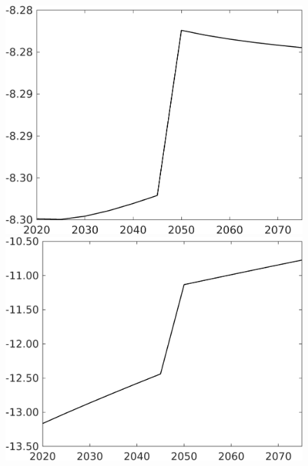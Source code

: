 \documentclass[12pt]{article}
\begin{document}
\begin{figure}[h!!]
\begin{minipage}[]{0.32\textwidth}
	\end{minipage}
	\begin{minipage}[]{0.32\textwidth}
		\includegraphics[width=1\textwidth]{../../codding_model/own_basedOnFried/optimalPol_010922_revision/figures/all_13Sept22/CompTaufPER_bytaul_Reg0_Ln_spillover0_nsk0_xgr1_knspil0_sep1_LFlimit1_emsbase0_countec0_GovRev0_etaa0.79_lgd0.png}
	\end{minipage}			
	\begin{minipage}[]{0.32\textwidth}
		\includegraphics[width=1\textwidth]{../../codding_model/own_basedOnFried/optimalPol_010922_revision/figures/all_13Sept22/CompTaufPER_bytaul_Reg0_GFF_spillover0_nsk0_xgr1_knspil0_sep1_LFlimit1_emsbase0_countec0_GovRev0_etaa0.79_lgd0.png}

\end{minipage}
\end{figure}
\end{document}
